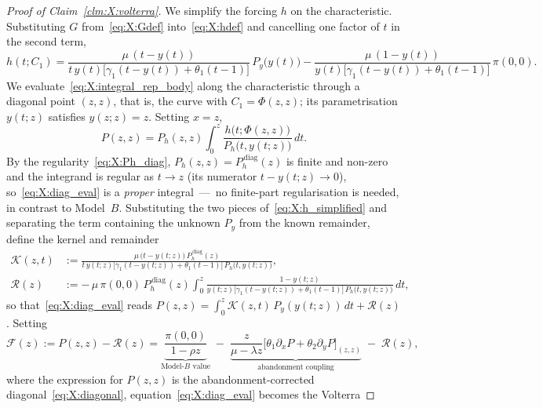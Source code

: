 \begin{proof}[Proof of Claim~\ref{clm:X:volterra}]
We simplify the forcing $h$ on the characteristic. Substituting $G$
from~\eqref{eq:X:Gdef} into~\eqref{eq:X:hdef} and cancelling one factor of $t$ in the
second term,
\begin{equation}
    h(t;C_1)
    = \frac{\mu\,(t-y(t))}{t\,y(t)\bigl[\gamma_1(t-y(t))+\theta_1(t-1)\bigr]}\,P_y\!\bigl(y(t)\bigr)
    - \frac{\mu\,(1-y(t))}{y(t)\bigl[\gamma_1(t-y(t))+\theta_1(t-1)\bigr]}\,\pi(0,0).
    \label{eq:X:h_simplified}
\end{equation}
We evaluate~\eqref{eq:X:integral_rep_body} along the characteristic through a diagonal
point $(z,z)$, that is, the curve with $C_1=\Phi(z,z)$; its parametrisation $y(t;z)$
satisfies $y(z;z)=z$. Setting $x=z$,
\begin{equation}
    P(z,z) = P_h(z,z)\int_0^z \frac{h\bigl(t;\Phi(z,z)\bigr)}{P_h\bigl(t,y(t;z)\bigr)}\,dt.
    \label{eq:X:diag_eval}
\end{equation}
By the regularity~\eqref{eq:X:Ph_diag}, $P_h(z,z)=P_h^{\,\mathrm{diag}}(z)$ is finite and
non-zero and the integrand is regular as $t\to z$ (its numerator
$t-y(t;z)\to0$), so~\eqref{eq:X:diag_eval} is a \emph{proper} integral~---~no
finite-part regularisation is needed, in contrast to Model~$B$. Substituting the two
pieces of~\eqref{eq:X:h_simplified} and separating the term containing the unknown $P_y$
from the known remainder, define the kernel and remainder
\begin{align}
    \mathcal{K}(z,t) &:= \frac{\mu\,\bigl(t-y(t;z)\bigr)\,P_h^{\,\mathrm{diag}}(z)}
        {t\,y(t;z)\bigl[\gamma_1(t-y(t;z))+\theta_1(t-1)\bigr]\,P_h\bigl(t,y(t;z)\bigr)},
    \label{eq:X:kernel}\\[6pt]
    \mathcal{R}(z) &:= -\,\mu\,\pi(0,0)\,P_h^{\,\mathrm{diag}}(z)
        \int_0^z \frac{1-y(t;z)}
        {y(t;z)\bigl[\gamma_1(t-y(t;z))+\theta_1(t-1)\bigr]\,P_h\bigl(t,y(t;z)\bigr)}\,dt,
    \label{eq:X:Rdef}
\end{align}
so that~\eqref{eq:X:diag_eval} reads
$P(z,z)=\int_0^z\mathcal{K}(z,t)\,P_y(y(t;z))\,dt+\mathcal{R}(z)$. Setting
\begin{equation}
    \mathcal{F}(z) := P(z,z) - \mathcal{R}(z)
    = \underbrace{\frac{\pi(0,0)}{1-\rho z}}_{\text{Model-}B\text{ value}}
      \;-\;\underbrace{\frac{z}{\mu-\lambda z}
        \bigl[\theta_1\partial_x P + \theta_2\partial_y P\bigr]_{(z,z)}}_{\text{abandonment coupling}}
      \;-\;\mathcal{R}(z),
    \label{eq:X:rhs}
\end{equation}
where the expression for $P(z,z)$ is the abandonment-corrected
diagonal~\eqref{eq:X:diagonal}, equation~\eqref{eq:X:diag_eval} becomes the Volterra

\end{proof}
